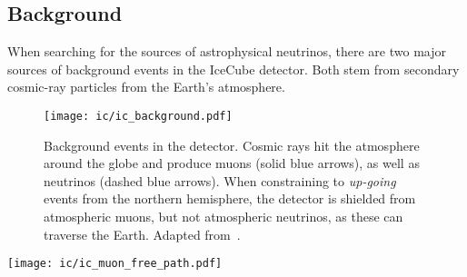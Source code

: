 \subsection{Background}\label{background}

When searching for the sources of astrophysical neutrinos, there are two major sources of background events in the IceCube detector. Both stem from secondary cosmic-ray particles from the Earth's atmosphere.

\begin{figure}[htb]
    \texttt{[image: ic/ic\_background.pdf]}
    \caption[Background events]{Background events in the detector. Cosmic rays hit the atmosphere around the globe and produce muons (solid blue arrows), as well as neutrinos (dashed blue arrows). When constraining to \textit{up-going} events from the northern hemisphere, the detector is shielded from atmospheric muons, but not atmospheric neutrinos, as these can traverse the Earth. Adapted from~\cite{Ahlers2018a}.}
\end{figure}

\begin{marginfigure}
    \texttt{[image: ic/ic\_muon\_free\_path.pdf]}
    \caption[Muon free path in ice]{Free path length for \SI{1}{\peta\eV} muons in ice. The mean free path in ice is slightly longer than in rock. Adapted from~\cite{Chirkin2004}.}
\end{marginfigure}

